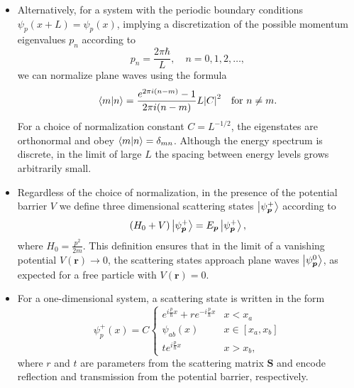 \documentclass[11pt, a4paper]{article}
\renewcommand{\vec}[1]{\bm{#1}}  %
\newcommand{\mat}[1]{\mathbf{#1}}  %
\renewcommand{\r}{\vec{r}}  %
\renewcommand{\SS}{\mat{S}}  %
\begin{document}
\begin{itemize}
    \item Alternatively, for a system with the periodic boundary conditions $ \psi_{p}(x + L) = \psi_{p}(x) $, implying a discretization of the possible momentum eigenvalues $ p_{n} $ according to
    \begin{equation*}
        p_{n} = \frac{2\pi \hbar}{L}, \quad n = 0, 1, 2, \ldots,
    \end{equation*}
    we can normalize plane waves using the formula
    \begin{equation*}
        \braket{m}{n} = \frac{e^{2 \pi i(n - m)} - 1}{2\pi i (n-m)}L \abs{C}^{2} \quad \text{for } n \neq m.
    \end{equation*}
    For a choice of normalization constant $ C = L^{-1/2} $, the eigenstates are orthonormal and obey $ \braket{m}{n} = \delta_{mn} $. Although the energy spectrum is discrete, in the limit of large $ L $ the spacing between energy levels grows arbitrarily small. 

    
    \item Regardless of the choice of normalization, in the presence of the potential barrier $ V $ we define three dimensional scattering states $ \ket{\psi_{\vec{p}}^{+}} $ according to
    \begin{equation*}
        (H_{0} + V) \ket{\psi_{\vec{p}}^{+}} = E_{\vec{p}}\ket{\psi_{\vec{p}}^{+}},
    \end{equation*}
    where $ H_{0} = \frac{p^{2}}{2m} $. This definition ensures that in the limit of a vanishing potential $ V(\vec{r}) \to 0 $, the scattering states approach plane waves $ \ket{\psi_{\vec{p}}^{0}} $, as expected for a free particle with $ V(\r) = 0 $.

    \item For a one-dimensional system, a scattering state is written in the form
    \begin{equation*}
        \psi_{p}^{+}(x) = C
        \begin{cases}
            e^{i \frac{p}{\hbar} x} + r e^{-i \frac{p}{\hbar} x} & x < x_{a}\\
            \psi_{ab}(x) & x \in [x_{a}, x_{b}]\\
            t e^{i \frac{p}{\hbar}x} & x > x_{b},
        \end{cases}
    \end{equation*}
    where $ r $ and $ t $ are parameters from the scattering matrix $ \SS $ and encode reflection and transmission from the potential barrier, respectively. 



\end{itemize}
\end{document}
